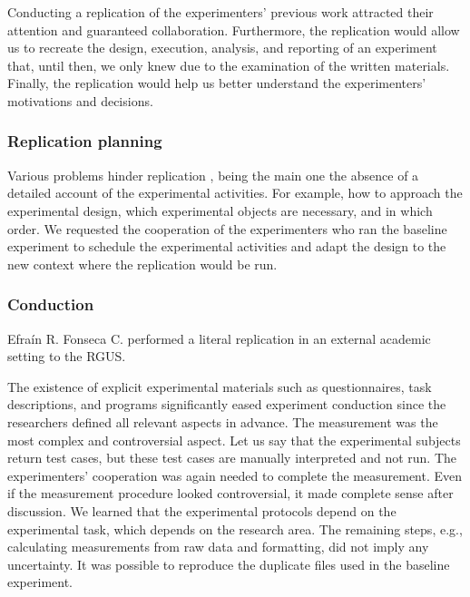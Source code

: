 Conducting a replication of the experimenters' previous work attracted their attention and guaranteed collaboration. Furthermore, the replication would allow us to recreate the design, execution, analysis, and reporting of an experiment that, until then, we only knew due to the examination of the written materials. Finally, the replication would help us better understand the experimenters' motivations and decisions.

\subsubsection{Replication planning}
Various problems hinder replication \cite{Gallardo-2012-CG-PL-SE,Vegas-2006-communication-researchers,Miller-2005-replicating-SE-experiments,Gomez-2014-understanding-replication,Demagalhaes-2015-replications-SE,Carver-2010-guidelines-replication-SE}, being the main one the absence of a detailed account of the experimental activities. For example, how to approach the experimental design, which experimental objects are necessary, and in which order. We requested the cooperation of the experimenters who ran the baseline experiment to schedule the experimental activities and adapt the design to the new context where the replication would be run.

\subsubsection{Conduction}
Efra\'in R. Fonseca C. performed a literal replication \cite{Gomez-2014-understanding-replication} in an external academic setting to the RGUS.

The existence of explicit experimental materials such as questionnaires, task descriptions, and programs significantly eased experiment conduction since the researchers defined all relevant aspects in advance. The measurement was the most complex and controversial aspect. Let us say that the experimental subjects return test cases, but these test cases are manually interpreted and not run. The experimenters' cooperation was again needed to complete the measurement. Even if the measurement procedure looked controversial, it made complete sense after discussion. We learned that the experimental protocols depend on the experimental task, which depends on the research area. The remaining steps, e.g., calculating measurements from raw data and formatting, did not imply any uncertainty. It was possible to reproduce the duplicate files used in the baseline experiment.

